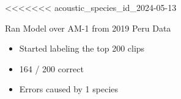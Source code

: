 




<<<<<<< acoustic_species_id_2024-05-13
\begin{frame}{Ran Model over AM-1 from 2019 Peru Data}
    \begin{itemize}
        \item Started labeling the top 200 clips
        \item 164 / 200 correct
        \item Errors caused by 1 species
    \end{itemize}
\end{frame}

